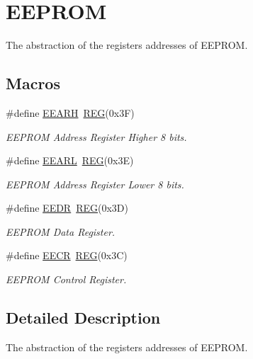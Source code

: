 \hypertarget{group__EEPROMMCAL}{\section{E\+E\+P\+R\+O\+M}
\label{group__EEPROMMCAL}
}


The abstraction of the registers addresses of E\+E\+P\+R\+O\+M.  


\subsection*{Macros}
\begin{DoxyCompactItemize}
\item 
\hypertarget{group__EEPROMMCAL_ga599133b3955cc007d55157e126e6363b}{\#define \hyperlink{group__EEPROMMCAL_ga599133b3955cc007d55157e126e6363b}{E\+E\+A\+R\+H}~\hyperlink{group__MCAL_ga72e45020e46f285689db51c46f273403}{R\+E\+G}(0x3\+F)}\label{group__EEPROMMCAL_ga599133b3955cc007d55157e126e6363b}

\begin{DoxyCompactList}\small\item\em E\+E\+P\+R\+O\+M Address Register Higher 8 bits. \end{DoxyCompactList}\item 
\hypertarget{group__EEPROMMCAL_ga9da3eab51570f2bad12561934e9b5a94}{\#define \hyperlink{group__EEPROMMCAL_ga9da3eab51570f2bad12561934e9b5a94}{E\+E\+A\+R\+L}~\hyperlink{group__MCAL_ga72e45020e46f285689db51c46f273403}{R\+E\+G}(0x3\+E)}\label{group__EEPROMMCAL_ga9da3eab51570f2bad12561934e9b5a94}

\begin{DoxyCompactList}\small\item\em E\+E\+P\+R\+O\+M Address Register Lower 8 bits. \end{DoxyCompactList}\item 
\hypertarget{group__EEPROMMCAL_ga122a28fcaa579402849a4520be9eea40}{\#define \hyperlink{group__EEPROMMCAL_ga122a28fcaa579402849a4520be9eea40}{E\+E\+D\+R}~\hyperlink{group__MCAL_ga72e45020e46f285689db51c46f273403}{R\+E\+G}(0x3\+D)}\label{group__EEPROMMCAL_ga122a28fcaa579402849a4520be9eea40}

\begin{DoxyCompactList}\small\item\em E\+E\+P\+R\+O\+M Data Register. \end{DoxyCompactList}\item 
\hypertarget{group__EEPROMMCAL_ga1e68dc142e8c970490ca80a2723199dc}{\#define \hyperlink{group__EEPROMMCAL_ga1e68dc142e8c970490ca80a2723199dc}{E\+E\+C\+R}~\hyperlink{group__MCAL_ga72e45020e46f285689db51c46f273403}{R\+E\+G}(0x3\+C)}\label{group__EEPROMMCAL_ga1e68dc142e8c970490ca80a2723199dc}

\begin{DoxyCompactList}\small\item\em E\+E\+P\+R\+O\+M Control Register. \end{DoxyCompactList}\end{DoxyCompactItemize}


\subsection{Detailed Description}
The abstraction of the registers addresses of E\+E\+P\+R\+O\+M. 

